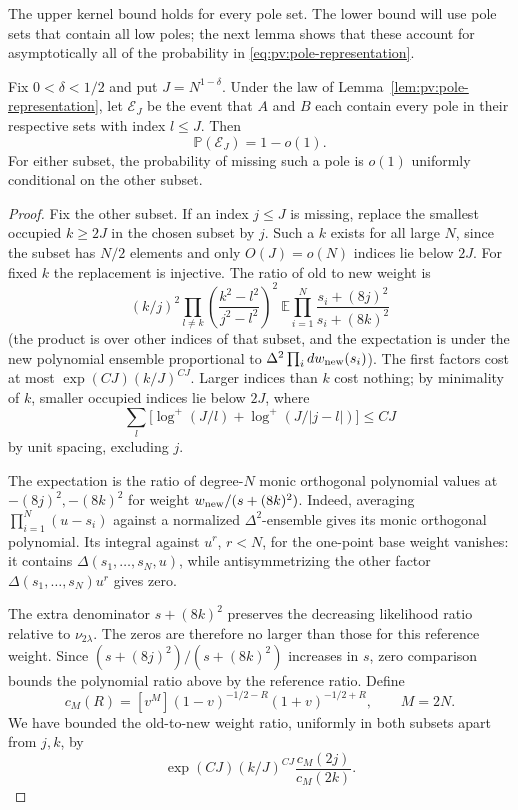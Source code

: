 The upper kernel bound holds for every pole set. The lower bound will use pole sets that contain all low poles; the next lemma shows that these account for asymptotically all of the probability in \eqref{eq:pv:pole-representation}.

\begin{lemma}\label{lem:pv:pole-saturation}
Fix \(0<\delta<1/2\) and put \(J=N^{1-\delta}\). Under the law of Lemma~\ref{lem:pv:pole-representation}, let \(\mathcal E_J\) be the event that \(A\) and \(B\) each contain every pole in their respective sets with index \(l\le J\). Then
\[
 \mathbb P(\mathcal E_J)=1-o(1).
\]
For either subset, the probability of missing such a pole is \(o(1)\) uniformly conditional on the other subset.
\end{lemma}

\begin{proof}
Fix the other subset. If an index \(j\le J\) is missing, replace the smallest occupied \(k\ge2J\) in the chosen subset by \(j\). Such a \(k\) exists for all large \(N\), since the subset has \(N/2\) elements and only \(O(J)=o(N)\) indices lie below \(2J\). For fixed \(k\) the replacement is injective. The ratio of old to new weight is
\[
 (k/j)^2\prod_{l\ne k}\left(\frac{k^2-l^2}{j^2-l^2}\right)^2
 \ \mathbb E\prod_{i=1}^N\frac{s_i+(8j)^2}{s_i+(8k)^2}
\]
(the product is over other indices of that subset, and the expectation is under the new polynomial ensemble proportional to \(\Delta^2\prod_i dw_{\rm new}(s_i)\)). The first factors cost at most \(\exp(CJ)(k/J)^{CJ}\). Larger indices than \(k\) cost nothing; by minimality of \(k\), smaller occupied indices lie below \(2J\), where
\[
 \sum_l\big[\log^+(J/l)+\log^+(J/|j-l|)\big]\le CJ
\]
by unit spacing, excluding \(j\).

The expectation is the ratio of degree-\(N\) monic orthogonal polynomial values at \(-(8j)^2,-(8k)^2\) for weight \(w_{\rm new}/(s+(8k)^2)\). Indeed, averaging \(\prod_{i=1}^N(u-s_i)\) against a normalized \(\Delta^2\)-ensemble gives its monic orthogonal polynomial. Its integral against \(u^r\), \(r<N\), for the one-point base weight vanishes: it contains \(\Delta(s_1,\ldots,s_N,u)\), while antisymmetrizing the other factor \(\Delta(s_1,\ldots,s_N)u^r\) gives zero.

The extra denominator \(s+(8k)^2\) preserves the decreasing likelihood ratio relative to \(\nu_{2\lambda}\). The zeros are therefore no larger than those for this reference weight. Since \((s+(8j)^2)/(s+(8k)^2)\) increases in \(s\), zero comparison bounds the polynomial ratio above by the reference ratio. Define
\[
 c_M(R)=[v^M](1-v)^{-1/2-R}(1+v)^{-1/2+R},\qquad M=2N.
\]
We have bounded the old-to-new weight ratio, uniformly in both subsets apart from \(j,k\), by
\begin{equation}\label{eq:pv:pole-replacement-bound}
 \exp(CJ)(k/J)^{CJ}\frac{c_M(2j)}{c_M(2k)}.
\end{equation}


\end{proof}
